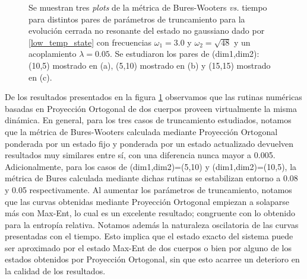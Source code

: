 \documentclass{report} %
\numberwithin{equation}{section}
\begin{document}
\begin{figure}
\centering
{}
\caption{Se muestran tres \textit{plots} de la métrica de Bures-Wooters \textit{vs.} tiempo para distintos pares de parámetros de truncamiento para la evolución cerrada no resonante del estado no gaussiano dado por \eqref{low_temp_state} con frecuencias $\omega_1 = 3.0$ y $\omega_2 =\sqrt{48}$ y un acoplamiento $\lambda = 0.05$. Se estudiaron los pares de (dim1,dim2): (10,5) mostrado en (a), (5,10) mostrado en (b) y (15,15) mostrado en (c).}
\label{closed_ng_nr}
\end{figure}

De los resultados presentados en la figura \ref{closed_ng_nr} observamos que las rutinas numéricas basadas en Proyección Ortogonal de dos cuerpos proveen virtualmente la misma dinámica. En general, para los tres casos de truncamiento estudiados, notamos que la métrica de Bures-Wooters calculada mediante Proyección Ortogonal ponderada por un estado fijo y ponderada por un estado actualizado devuelven resultados muy similares entre sí, con una diferencia nunca mayor a 0.005. Adicionalmente, para los casos de (dim1,dim2)=(5,10) y (dim1,dim2)=(10,5), la métrica de Bures calculada mediante dichas rutinas se estabilizan entorno a 0.08 y 0.05 respectivamente. Al aumentar los parámetros de truncamiento, notamos que las curvas obtenidas mediante Proyección Ortogonal empiezan a solaparse más con Max-Ent, lo cual es un excelente resultado; congruente con lo obtenido para la entropía relativa. Notamos además la naturaleza oscilatoria de las curvas presentadas con el tiempo. Esto implica que el estado exacto del sistema puede ser aproximado por el estado Max-Ent de dos cuerpos o bien por alguno de los estados obtenidos por Proyección Ortogonal, sin que esto acarree un deterioro en la calidad de los resultados. 
\end{document}
